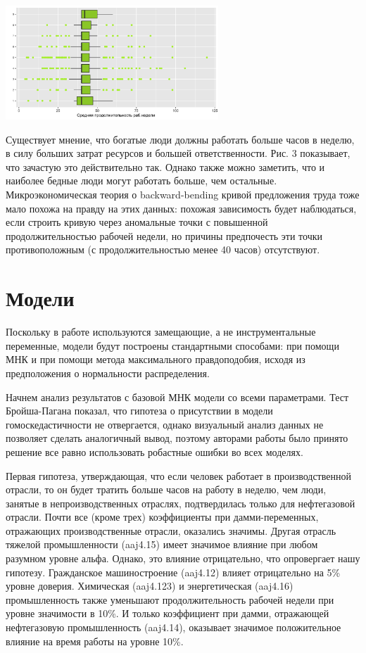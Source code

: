 \documentclass[12pt, a4paper]{article}
\begin{document}
{		\begin{center}
			\includegraphics[width=0.6\textwidth]{step02_proposal/rich.png}
		\end{center}
		Существует мнение, что богатые люди должны работать больше часов в неделю, в силу больших затрат ресурсов и большей ответственности. Рис. 3 показывает, что зачастую это действительно так. Однако также можно заметить, что и наиболее бедные люди могут работать больше, чем остальные. Микроэкономическая теория о backward-bending кривой  предложения труда тоже мало похожа на правду на этих данных: похожая зависимость будет наблюдаться, если строить кривую через аномальные точки с повышенной продолжительностью рабочей недели, но причины предпочесть эти точки противоположным (с продолжительностью менее 40 часов) отсутствуют.
		
		\section{Модели}
		Поскольку в работе используются замещающие, а не инструментальные переменные, модели будут построены стандартными способами: при помощи МНК и при помощи метода максимального правдоподобия, исходя из предположения о нормальности распределения. 
		
		Начнем анализ результатов с базовой МНК модели со всеми параметрами. Тест Бройша-Пагана показал, что гипотеза о присутствии в модели гомоскедастичности не отвергается, однако визуальный анализ данных не позволяет сделать аналогичный вывод, поэтому авторами работы было принято решение все равно использовать робастные ошибки во всех моделях.
		
		Первая гипотеза, утверждающая, что если человек работает в производственной отрасли, то он будет тратить больше часов на работу в неделю, чем люди, занятые в непроизводственных отраслях, подтвердилась только для нефтегазовой отрасли. Почти все (кроме трех) коэффициенты при дамми-переменных, отражающих производственные отрасли, оказались значимы. Другая отрасль тяжелой промышленности (aaj4.15) имеет значимое влияние при любом разумном уровне альфа. Однако, это влияние отрицательно, что опровергает нашу гипотезу. Гражданское машиностроение (aaj4.12) влияет отрицательно на 5\% уровне доверия. Химическая (aaj4.123) и энергетическая (aaj4.16) промышленность также уменьшают продолжительность рабочей недели при уровне значимости в 10\%.  И только коэффициент при дамми, отражающей нефтегазовую промышленность (aaj4.14), оказывает значимое положительное влияние на время работы на уровне 10\%. 
		
}
\end{document}
